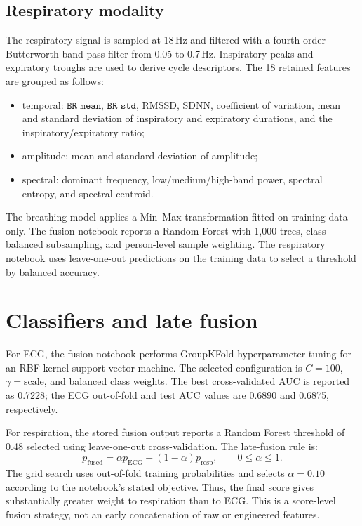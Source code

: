 \documentclass[11pt,a4paper]{article}
\begin{document}
\subsection{Respiratory modality}
The respiratory signal is sampled at 18\,Hz and filtered with a fourth-order Butterworth band-pass filter from 0.05 to 0.7\,Hz. Inspiratory peaks and expiratory troughs are used to derive cycle descriptors. The 18 retained features are grouped as follows:
\begin{itemize}
  \item temporal: $\texttt{BR\_mean}$, $\texttt{BR\_std}$, RMSSD, SDNN, coefficient of variation, mean and standard deviation of inspiratory and expiratory durations, and the inspiratory/expiratory ratio;
  \item amplitude: mean and standard deviation of amplitude;
  \item spectral: dominant frequency, low/medium/high-band power, spectral entropy, and spectral centroid.
\end{itemize}
The breathing model applies a Min--Max transformation fitted on training data only. The fusion notebook reports a Random Forest with 1,000 trees, class-balanced subsampling, and person-level sample weighting. The respiratory notebook uses leave-one-out predictions on the training data to select a threshold by balanced accuracy.

\section{Classifiers and late fusion}
For ECG, the fusion notebook performs GroupKFold hyperparameter tuning for an RBF-kernel support-vector machine. The selected configuration is $C=100$, $\gamma=\text{scale}$, and balanced class weights. The best cross-validated AUC is reported as 0.7228; the ECG out-of-fold and test AUC values are 0.6890 and 0.6875, respectively.

For respiration, the stored fusion output reports a Random Forest threshold of 0.48 selected using leave-one-out cross-validation. The late-fusion rule is:
\begin{equation}
  p_{\mathrm{fused}} = \alpha p_{\mathrm{ECG}} + (1-\alpha)p_{\mathrm{resp}},
  \qquad 0\leq\alpha\leq 1.
\end{equation}
The grid search uses out-of-fold training probabilities and selects $\alpha=0.10$ according to the notebook's stated objective. Thus, the final score gives substantially greater weight to respiration than to ECG. This is a score-level fusion strategy, not an early concatenation of raw or engineered features.
\end{document}
